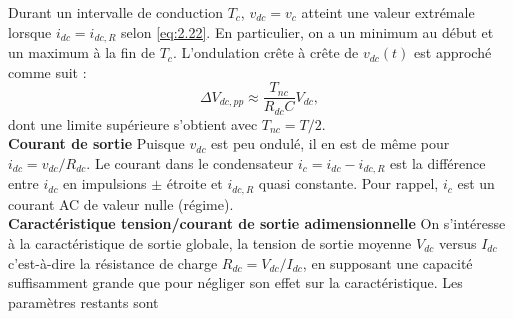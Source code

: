 			Durant un intervalle de conduction $T_c$, $v_{dc} = v_c$ atteint une valeur extrémale lorsque $i_{dc} = i_{dc,R}$ selon \eqref{eq:2.22}. En particulier, on a un minimum au début et un maximum à la fin de $T_c$. L'ondulation crête à crête de $v_{dc}(t)$ est approché comme suit :
			\begin{equation}
				\Delta V_{dc,pp} \approx \frac{T_{nc}}{R_{dc}C}V_{dc},
			\end{equation}
			dont une limite supérieure s'obtient avec $T_{nc} = T/2$.
			\\
			
			\textbf{Courant de sortie} \qquad Puisque $v_{dc}$ est peu ondulé, il en est de même pour $i_{dc} = v_{dc}/R_{dc}$. Le courant dans le condensateur $i_c = i_{dc}-i_{dc,R}$ est la différence entre $i_{dc}$ en impulsions $\pm$ étroite et $i_{dc,R}$ quasi constante. Pour rappel, $i_c$ est un courant AC de valeur nulle (régime). 
			\\
			
			\textbf{Caractéristique tension/courant de sortie adimensionnelle} \qquad On s'intéresse à la caractéristique de sortie globale, la tension de sortie moyenne $V_{dc}$ versus $I_{dc}$ c'est-à-dire la résistance de charge $R_{dc}=V_{dc}/I_{dc}$, en supposant une capacité suffisamment grande que pour négliger son effet sur la caractéristique. Les paramètres restants sont 


